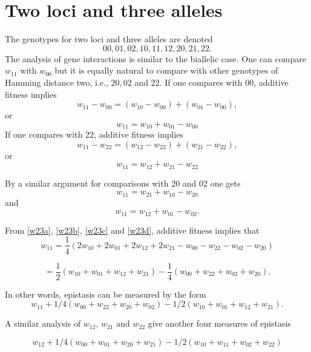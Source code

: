 \documentclass[12pt]{amsart}
\theoremstyle{plain}
\theoremstyle{definition}
\begin{document}
\section{Two loci and three alleles}
The  genotypes for two loci and three alleles are denoted
\[
00, 01, 02, 10, 11, 12, 20, 21, 22.
\]
The analysis of gene interactions is similar to
the biallelic case. One can compare $w_{11}$ 
with $w_{00}$ but it is equally natural to
compare with other genotypes of Hamming distance two,
i.e., $20, 02$ and  $22$.
If one compares with $00$, additive fitness implies
\[
w_{11}-w_{00}= (w_{10}-w_{00}) +(w_{01}-w_{00}),
\]
or
\begin{equation}\label{w23a}
w_{11}= w_{10}+w_{01}-w_{00} 
\end{equation}
If one compares with 22, additive fitness implies
\[
w_{11}-w_{22}=(w_{12}-w_{22}) +(w_{21}-w_{22}),
\]
or 
\begin{equation}\label{w23b}
w_{11}=w_{12}+w_{21}-w_{22}
\end{equation}


By a similar argument for comparisons with 20 and 02
one gets
\begin{equation}\label{w23c}
w_{11}=w_{21}+w_{10}-w_{20}
\end{equation}
and
\begin{equation}\label{w23d}
 w_{11}=w_{12}+w_{01}-w_{02}.
\end{equation}

From \ref{w23a}, \ref{w23b}, \ref{w23c} and \ref{w23d},
additive fitness implies that
\[
w_{11} = \frac{1}{4} \left( 2w_{10}+2w_{01}+2w_{12}+2w_{21}-w_{00}-w_{22}-w_{02}-w_{20} \right)
\]


\[
= \frac{1}{2}  \left( w_{10}+w_{01}+w_{12}+w_{21}\right)  - \frac{1}{4} \left(w_{00}+w_{22}+w_{02}+w_{20} \right).
\]




In other words, epistasis can be measured by the form
\begin{equation}\label{wc231}
w_{11}+1/4 (w_{00}+w_{22}+w_{20}+w_{02}) - 1/2  \left( w_{10}+w_{01}+w_{12}+w_{21} \right).
\end{equation}

A similar analysis of  $w_{12}$, $w_{21}$ and $w_{22}$  give another four measures of epistasis


\begin{equation}\label{wc232}
w_{12}+1/4 (w_{00}+w_{01}+w_{20}+w_{21}) - 1/2  \left( w_{10}+w_{11}+w_{02}+w_{22} \right)
\end{equation}
\end{document}
